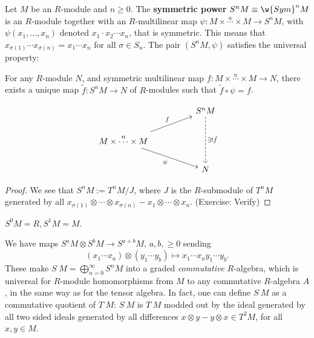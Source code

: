 \begin{defn}
    Let $M$ be an $R$-module and $n \geq 0$. The \textbf{symmetric power} $S^nM \equiv \w{Sym} ^nM$ is an $R$-module together with an $R$-multilinear map $\psi :M \times \overset{n}{\cdots } \times M \to S^nM$, with $\psi (x_1,\dots,x_n)$ denoted $x_1\cdot x_2 \cdots x_n$, that is symmetric. This means that $x_{\sigma(1)}\cdots x_{\sigma (n)}=x_1\cdots x_n$ for all $\sigma \in S_n$. The pair $(S^nM, \psi)$ satisfies the universal property:

    For any $R$-module $N$, and symmetric multilinear map $f:M \times \overset{n}{\cdots} \times M \to N$, there exists a unique map $\tilde f : S^nM \to N$ of $R$-modules such that $\tilde f \circ \psi = f$.
\end{defn}
\[\begin{tikzcd}
	&& S^nM \\
	{M \times \overset{n}{\cdots } \times M} \\
	&& {N}
	\arrow["{\exists ! \tilde f}", dashed, from=1-3, to=3-3]
	\arrow["f", from=2-1, to=1-3]
	\arrow["\psi"', from=2-1, to=3-3]
\end{tikzcd}\]
\begin{proof}
    We see that $S^nM := T^nM / J$, where $J$ is the $R$-submodule of $T^nM$ generated by all $x_{\sigma(1)}\otimes \cdots \otimes x_{\sigma (n)}- x_1\otimes \cdots \otimes x_n$. (Exercise: Verify)
\end{proof}

\begin{notebox*}[Convention]
    $S^0M = R,S^1M=M$.
\end{notebox*}

We have maps $S^aM \otimes S^bM \to S^{a+b}M$, $a,b,\geq 0$ sending
$$(x_1\cdots x_a) \otimes (y_1\cdots  y_b) \mapsto x_1 \cdots x_a y_1 \cdots y_b.$$
These make $S^\cdot M= \bigoplus_{n=0}^\infty S^nM$ into a graded \textit{commutative} $R$-algebra, which is universal for $R$-module homomorphisms from $M$ to any commutative $R$-algebra $A$, in the same way as for the tensor algebra. In fact, one can define $S^\cdot M$ as a commutative quotient of $T^\cdot M$: $S^\cdot M$ is $T^\cdot M$ modded out by the ideal generated by all two sided ideals generated by all differences $x \otimes y - y \otimes x \in T^2M$, for all $x,y \in M$.

